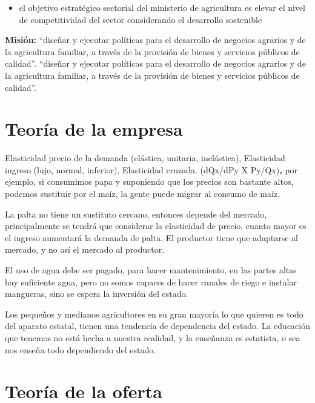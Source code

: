 \documentclass[
  letterpaper,
  DIV=11,
  numbers=noendperiod]{scrartcl}
\providecommand{\tightlist}{%
  \setlength{\itemsep}{0pt}\setlength{\parskip}{0pt}}\usepackage{longtable,booktabs,array}
\begin{document}
\begin{itemize}
\tightlist
\item
  el objetivo estratégico sectorial del ministerio de agricultura es
  elevar el nivel de competitividad del sector considerando el
  desarrollo sostenible
\end{itemize}

\textbf{Misión:} ``diseñar y ejecutar políticas para el desarrollo de
negocios agrarios y de la agricultura familiar, a través de la provisión
de bienes y servicios públicos de calidad''. ``diseñar y ejecutar
políticas para el desarrollo de negocios agrarios y de la agricultura
familiar, a través de la provisión de bienes y servicios públicos de
calidad''.

\hypertarget{teoruxeda-de-la-empresa}{%
\section{Teoría de la empresa}\label{teoruxeda-de-la-empresa}}

Elasticidad precio de la demanda (elástica, unitaria, inelástica),
Elasticidad ingreso (lujo, normal, inferior), Elasticidad cruzada.
(dQx/dPy X Py/Qx)\textbf{,} por ejemplo, si consumimos papa y suponiendo
que los precios son bastante altos, podemos sustituir por el maíz, la
gente puede migrar al consumo de maíz.

La palta no tiene un sustituto cercano, entonces depende del mercado,
principalmente se tendrá que considerar la elasticidad de precio, cuanto
mayor es el ingreso aumentará la demanda de palta. El productor tiene
que adaptarse al mercado, y no así el mercado al productor.

El uso de agua debe ser pagado, para hacer mantenimiento, en las partes
altas hay suficiente agua, pero no somos capaces de hacer canales de
riego e instalar mangueras, sino se espera la inversión del estado.

Los pequeños y medianos agricultores en su gran mayoría lo que quieren
es todo del aparato estatal, tienen una tendencia de dependencia del
estado. La educación que tenemos no está hecha a nuestra realidad, y la
enseñanza es estatista, o sea nos enseña todo dependiendo del estado.

\hypertarget{teoruxeda-de-la-oferta}{%
\section{Teoría de la oferta}\label{teoruxeda-de-la-oferta}}
\end{document}
